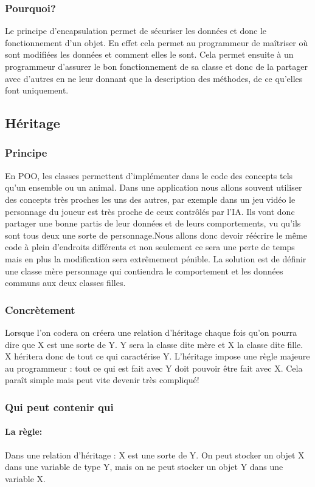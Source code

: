 \documentclass[10pt,a4paper,twoside]{article}
\begin{document}
\subsubsection{Pourquoi?}
Le principe d'encapsulation permet de sécuriser les données et donc le fonctionnement d'un objet. En effet cela permet au programmeur de maîtriser où sont modifiées les données et comment elles le sont. Cela permet ensuite à un programmeur d'assurer le bon fonctionnement de sa classe et donc de la partager avec d'autres en ne leur donnant que la description des méthodes, de ce qu'elles font uniquement.

\subsection{Héritage}
\subsubsection{Principe}
En POO, les classes permettent d'implémenter dans le code des concepts tels qu'un ensemble ou un animal. Dans une application nous allons souvent utiliser des concepts très proches les uns des autres, par exemple dans un jeu vidéo le personnage du joueur est très proche de ceux contrôlés par l'IA. Ils vont donc partager une bonne partis de leur données et de leurs comportements, vu qu'ils sont tous deux une sorte de personnage.Nous allons donc devoir réécrire le même code à plein d'endroits différents et non seulement ce sera une perte de temps mais en plus la modification sera extrêmement pénible. La solution est de définir une classe mère personnage qui contiendra le comportement et les données communs aux deux classes filles. 

\subsubsection{Concrètement}
Lorsque l'on codera on créera une relation d'héritage chaque fois qu'on pourra dire que X est une sorte de Y. Y sera la classe dite mère et X la classe dite fille. X héritera donc de tout ce qui caractérise Y. L'héritage impose une règle majeure au programmeur : tout ce qui est fait avec Y doit pouvoir être fait avec X. Cela paraît simple mais peut vite devenir très compliqué!

\subsubsection{Qui peut contenir qui}
\paragraph{La règle:} Dans une relation d'héritage : X est une sorte de Y. On peut stocker un objet X dans une variable de type Y, mais on ne peut stocker un objet Y dans une variable X.
\end{document}
